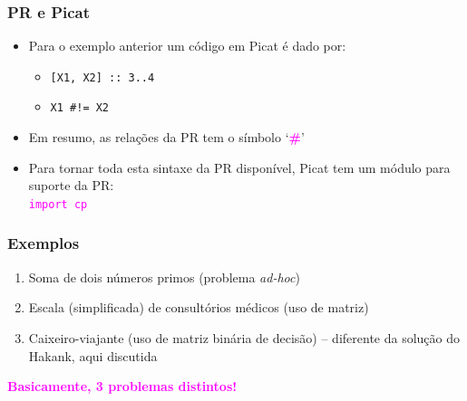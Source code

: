\begin{frame}[fragile]
\frametitle{PR e Picat}

\begin{block}{}

\begin{itemize}
    \item Para o exemplo anterior um  código em Picat é dado por:
      \pause
    \begin{itemize}
        \item \texttt{[X1, X2] :: 3..4}
        \item \texttt{X1 \#!= X2} 
     \end{itemize}  
      
      \pause
     \item Em resumo, as relações da PR tem o símbolo `\textbf{\textcolor{magenta}{{\#}}}' 

  \pause
  \item Para tornar toda esta sintaxe da PR disponível, Picat 
        tem um módulo para suporte da PR:\\
         \textcolor{magenta}{\texttt{import cp}}
    
\end{itemize}

\end{block}
    
\end{frame}

\begin{frame}[fragile] 

\frametitle{Exemplos}
\begin{block}{}
\begin{enumerate}
  \item Soma de dois números primos (problema \textit{ad-hoc})
  
  \pause
  \item Escala (simplificada) de consultórios médicos (uso de
  matriz)
    
  \pause
  \item Caixeiro-viajante (uso de matriz binária de decisão) -- diferente
  da solução do Hakank, aqui discutida
      
\end{enumerate}
\end{block}

  \begin{center}
  \textbf{\textcolor{magenta}{Basicamente, 3 problemas distintos!}}
  \end{center}

\end{frame}

